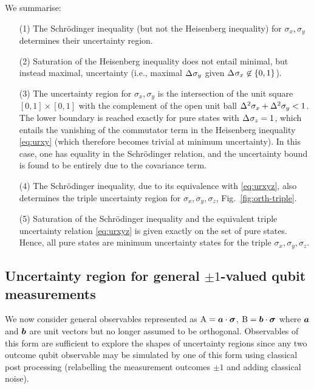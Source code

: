 We summarise:
\begin{enumerate}
  \setlength\itemsep{0pt}
\item[(1)]
  The Schr\"odinger inequality (but not the Heisenberg inequality) for $\sigma_x,\sigma_y$ determines their uncertainty region.
  
  \item[(2)]
  Saturation of the Heisenberg inequality does not entail minimal, but instead maximal, uncertainty  (i.e., maximal $\sdev{\sigma_y}$ given $\sdev{\sigma_x}\not\in\{0,1\}$).



\item[(3)]
  The uncertainty region for $\sigma_x,\sigma_y$ is the intersection of the unit square $[0,1]\times[0,1]$ with the complement of the open unit ball $\var{\sigma_x}+\var{\sigma_y}< 1$. The lower boundary is reached exactly for pure states with $\sdev{\sigma_z}=1$, which entails the vanishing of the commutator term in the Heisenberg inequality \eqref{eq:urxy} (which therefore becomes trivial at minimum uncertainty). In this case, one has equality in the Schr\"odinger relation, and the uncertainty bound is found to be entirely due to the covariance term.
  
  \item[(4)] The Schr\"odinger inequality, due to its equivalence with \eqref{eq:urxyz}, also determines the triple uncertainty region for $\sigma_x,\sigma_y,\sigma_z$, Fig.~\ref{fig:orth-triple}. 
  
  \item[(5)]
  Saturation of the Schr\"odinger inequality and  the equivalent triple uncertainty relation \eqref{eq:urxyz} is given exactly on the set of pure states. Hence, all pure states are minimum uncertainty states for the triple $\sigma_x,\sigma_y,\sigma_z$.


\end{enumerate}

\subsection{Uncertainty region for general $\pm 1$-valued qubit measurements}
\label{sec:qubit-uncertainty}
We  now consider general observables represented as $\operatorname{A}=\bm{a}\cdot{\boldsymbol\sigma}$, $\operatorname{B}=\bm{b}\cdot{\boldsymbol\sigma}$ where $\bm{a}$ and $\bm{b}$ are unit vectors but no longer assumed to be orthogonal. Observables of this form are sufficient to explore the shapes of uncertainty regions since any two outcome qubit observable may be simulated by one of this form using classical post processing (relabelling the measurement outcomes $\pm1$ and adding classical noise).

